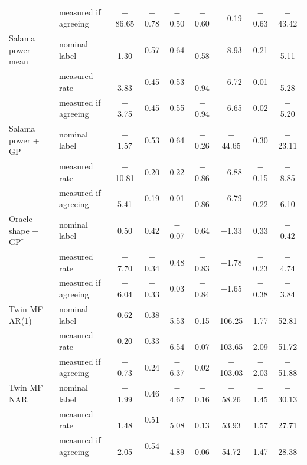 \begin{tabular}{@{}llccccccc@{}}
 & measured if agreeing & $-$86.65 & $-$0.78 & $-$0.50 & $-$0.60 & $-$0.19 & $-$0.63 & $-$43.42 \\
\addlinespace[1pt]
Salama power mean & nominal label & $-$1.30 & 0.57 & 0.64 & $-$0.58 & $-$8.93 & 0.21 & $-$5.11 \\
 & measured rate & $-$3.83 & 0.45 & 0.53 & $-$0.94 & $-$6.72 & 0.01 & $-$5.28 \\
 & measured if agreeing & $-$3.75 & 0.45 & 0.55 & $-$0.94 & $-$6.65 & 0.02 & $-$5.20 \\
\addlinespace[1pt]
Salama power + GP & nominal label & $-$1.57 & 0.53 & 0.64 & $-$0.26 & $-$44.65 & 0.30 & $-$23.11 \\
 & measured rate & $-$10.81 & 0.20 & 0.22 & $-$0.86 & $-$6.88 & $-$0.15 & $-$8.85 \\
 & measured if agreeing & $-$5.41 & 0.19 & 0.01 & $-$0.86 & $-$6.79 & $-$0.22 & $-$6.10 \\
\addlinespace[1pt]
Oracle shape + GP$^\dagger$ & nominal label & 0.50 & 0.42 & $-$0.07 & 0.64 & $-$1.33 & 0.33 & $-$0.42 \\
 & measured rate & $-$7.70 & $-$0.34 & 0.48 & $-$0.83 & $-$1.78 & $-$0.23 & $-$4.74 \\
 & measured if agreeing & $-$6.04 & $-$0.33 & 0.03 & $-$0.84 & $-$1.65 & $-$0.38 & $-$3.84 \\
\addlinespace[1pt]
Twin MF AR(1) & nominal label & 0.62 & 0.38 & $-$5.53 & $-$0.15 & $-$106.25 & $-$1.77 & $-$52.81 \\
 & measured rate & 0.20 & 0.33 & $-$6.54 & $-$0.07 & $-$103.65 & $-$2.09 & $-$51.72 \\
 & measured if agreeing & $-$0.73 & 0.24 & $-$6.37 & 0.02 & $-$103.03 & $-$2.03 & $-$51.88 \\
\addlinespace[1pt]
Twin MF NAR & nominal label & $-$1.99 & 0.46 & $-$4.67 & $-$0.16 & $-$58.26 & $-$1.45 & $-$30.13 \\
 & measured rate & $-$1.48 & 0.51 & $-$5.08 & $-$0.13 & $-$53.93 & $-$1.57 & $-$27.71 \\
 & measured if agreeing & $-$2.05 & 0.54 & $-$4.89 & $-$0.06 & $-$54.72 & $-$1.47 & $-$28.38 \\
\bottomrule
\end{tabular}
